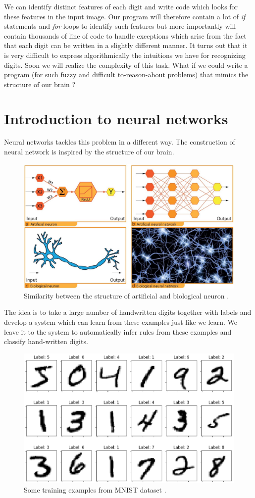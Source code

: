 We can identify distinct features of each digit and write code which looks for these features in the input image. 
Our program will therefore contain a lot of \emph{if} statements and \emph{for} loops to identify such features 
but more importantly will contain thousands of line of code to handle exceptions which arise from the fact that 
each digit can be written in a slightly different manner. It turns out that it is very difficult to express algorithmically 
the intuitions we have for recognizing digits. Soon we will realize the complexity of this task. What if we could write a 
program (for such fuzzy and difficult to-reason-about problems) that mimics the structure of our brain ?  
\section{Introduction to neural networks}
Neural networks tackles this problem in a different way. The construction of neural network
is inspired by the structure of our brain. 
\begin{figure}[htbp]
    \centering
    \includegraphics[width=.5\textwidth]{Figures/artificial_vs_normal_neurons.png}
    \caption{Similarity between the structure of artificial and biological neuron \cite{bio_art_neuron}.}
    \label{fig:bio_neu}
\end{figure} 
The idea is to take a large number of handwritten digits together with labels and develop a system 
which can learn from these examples just like we learn. We leave it to the system to automatically infer rules 
from these examples and classify hand-written digits. 
\begin{figure}[htbp]
    \centering
    \includegraphics[width=.5\textwidth]{Figures/training_examples_mnist.png}
    \caption{Some training examples from MNIST dataset \cite{lecun1998mnist}.}
    \label{fig:train_MNIST}
\end{figure} 

